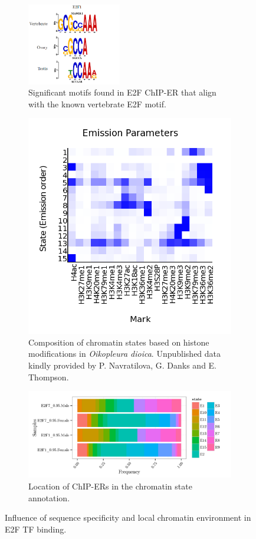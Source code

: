 \documentclass[11pt,twoside,a4paper]{report}
\begin{document}
		\begin{figure}
			\setlength{\belowcaptionskip}{5pt}
			\centering
			\begin{subfigure}[b]{1\textwidth}
				\centering
				\includegraphics[width=0.45\textwidth]{pngs/E2F_motifs.png}
				\caption{Significant motifs found in E2F ChIP-ER that align with the known vertebrate E2F motif.}
			\end{subfigure}
			\begin{subfigure}[b]{1\textwidth}
				\centering
				\includegraphics[width=0.5\linewidth]{pngs/ChromHMM_emissions_15.png}
				\caption{
					Composition of chromatin states based on histone modifications in \textit{Oikopleura dioica}.
					{\footnotesize 	Unpublished data kindly provided by P. Navratilova, G. Danks and E. Thompson.}
				}
			\end{subfigure}
			\begin{subfigure}[b]{1\textwidth}
				\centering
				\includegraphics[width=1\linewidth]{pngs/E2F_chromatinAnnotation.png}
				\caption{Location of ChIP-ERs in the chromatin state annotation.}
			\end{subfigure}
			\caption{Influence of sequence specificity and local chromatin environment in E2F TF binding.}
			\label{fig:E2F_influence}
		\end{figure}
		
\end{document}
